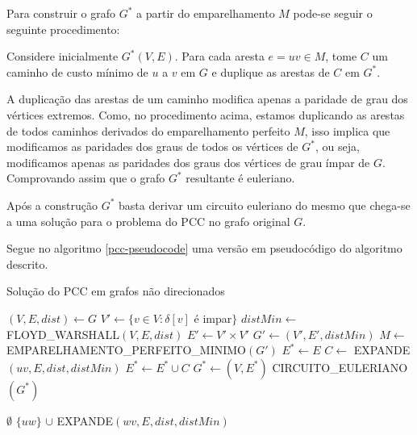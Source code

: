 Para construir o grafo $G^*$ a partir do emparelhamento $M$ pode-se seguir o seguinte procedimento:

Considere inicialmente $G^*(V, E)$. 
Para cada aresta $e = uv \in M$, tome $C$ um caminho de custo mínimo de $u$ a $v$ em $G$ e duplique as arestas de $C$ em $G^*$.

A duplicação das arestas de um caminho modifica apenas a paridade de grau dos vértices extremos.
Como, no procedimento acima, estamos duplicando as arestas de todos caminhos derivados do emparelhamento perfeito $M$, isso implica que modificamos as paridades dos graus de todos os vértices de $G^*$, ou seja, modificamos apenas as paridades dos graus dos vértices de grau ímpar de $G$.
Comprovando assim que o grafo $G^*$ resultante é euleriano. 


Após a construção $G^*$ basta derivar um circuito euleriano do mesmo que chega-se a uma solução para o problema do PCC no grafo original $G$.


Segue no algoritmo \ref{pcc-pseudocode} uma versão em pseudocódigo do algoritmo descrito.


    \begin{algorithm}
        \caption{Solução do PCC em grafos não direcionados}
        \label{pcc-pseudocode}
        \begin{algorithmic}[1]
        \State $(V, E, dist) \gets G$ 
        \State $V' \gets \{v \in V : \delta[v] $ é impar$\}$
        \State $distMin \gets $ FLOYD\_WARSHALL$(V, E, dist)$
        \State $E' \gets V' \times V'$
        \State $G' \gets (V', E', distMin)$
        \State $M \gets $ EMPARELHAMENTO\_PERFEITO\_MINIMO$(G')$
        \State $E^* \gets E$
            \State $C \gets$ EXPANDE$(uv, E, dist, distMin)$
            \State $E^* \gets E^* \cup C$
        \EndFor
        \State $G^* \gets (V, E^*)$
        \State \Return CIRCUITO\_EULERIANO$(G^*)$
        \EndFunction 

         
        \Return $\emptyset$
        \EndIf
            \State \Return $\{uw\}$  $\cup$ EXPANDE$(wv, E, dist, distMin)$
            \EndIf
        \EndFor
        \EndFunction

        \end{algorithmic}
    \end{algorithm}

